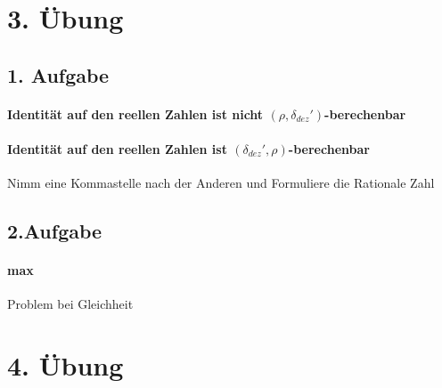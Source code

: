 \documentclass[ngerman]{scrartcl}
\begin{document}
\section{3. Übung}
\subsection*{1. Aufgabe}
\paragraph{Identität auf den reellen Zahlen ist nicht $ (\rho, \delta_{dez}') $-berechenbar} 
\paragraph{Identität auf den reellen Zahlen ist $ (\delta_{dez}', \rho) $-berechenbar} Nimm eine Kommastelle nach der Anderen und Formuliere die Rationale Zahl

\subsection*{2.Aufgabe} 
\paragraph{max} Problem bei Gleichheit


\section{4. Übung}




%
%
%
%
\end{document}
